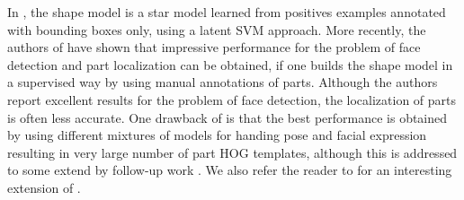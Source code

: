 \documentclass[runningheads]{llncs}
\begin{document}
In \cite{felzenszwalb2010object}, the shape model is a star model learned from positives examples annotated with bounding boxes only, using a latent SVM approach. More recently, the authors of \cite{ramanan2011} have shown that impressive performance for the problem of face detection and part localization can be obtained, if one builds the shape model in a supervised way by using manual annotations of parts. Although the authors report excellent results for the problem of face detection, the localization of parts is often less accurate. One drawback of \cite{ramanan2011} is that the best performance is obtained by using different mixtures of models for handing pose and facial expression resulting in very large number of part HOG templates, although this is addressed to some extend by follow-up work \cite{pirsiavash2012steerable}. We also refer the reader to \cite{yupose} for an interesting extension of \cite{ramanan2011}.
\end{document}
